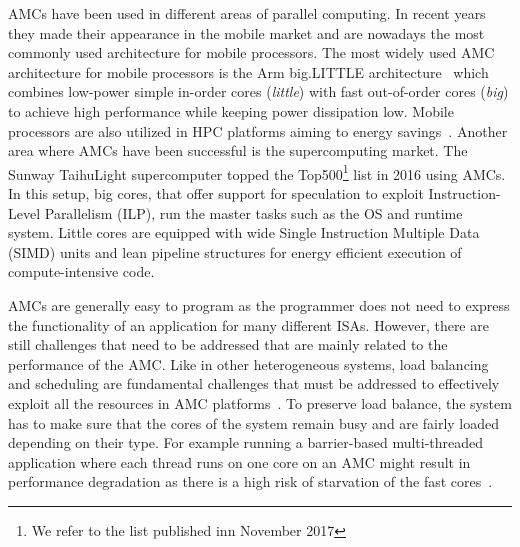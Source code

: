 AMCs have been used in different areas of parallel computing. 
In recent years they made their appearance in the mobile market and are nowadays the most commonly used architecture for mobile processors.
The most widely used AMC architecture for mobile processors is the Arm big.LITTLE architecture~\cite{Greenhalgh2011} which combines low-power simple in-order cores (\emph{little}) with fast out-of-order cores (\emph{big}) to achieve high performance while keeping power dissipation low.
Mobile processors are also utilized in HPC platforms aiming to energy savings~\cite{ARMV8}.
Another area where AMCs have been successful is the supercomputing market.
The Sunway TaihuLight supercomputer topped the Top500\footnote{We refer to the list published inn November 2017} list in 2016 using AMCs. 
In this setup, big cores, that offer support for speculation to exploit Instruction-Level Parallelism (ILP), run the master tasks such as the OS and runtime system.
Little cores are equipped with wide Single Instruction Multiple Data (SIMD) units and lean pipeline structures for energy efficient execution of compute-intensive code. 

AMCs are generally easy to program as the programmer does not need to express the functionality of an application for many different ISAs. 
However, there are still challenges that need to be addressed that are mainly related to the performance of the AMC.
Like in other heterogeneous systems, load balancing and scheduling are fundamental challenges that must be addressed to effectively exploit all the resources in AMC platforms~\cite{Suleman:APLOS2009,Fedorova2009,Greenhalgh2011,Joao:ASPLOS2012,Joao:ISCA2013,ARM4HPC_SC13}. 
To preserve load balance, the system has to make sure that the cores of the system remain busy and are fairly loaded depending on their type.
For example running a barrier-based multi-threaded application where each thread runs on one core on an AMC might result in performance degradation as there is a high risk of starvation of the fast cores~\cite{AMC_survey}. %

